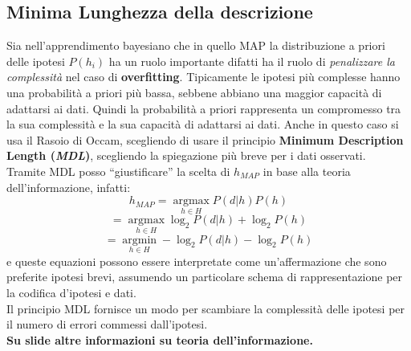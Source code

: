 \subsection{Minima Lunghezza della descrizione}
Sia nell'apprendimento bayesiano che in quello MAP la distribuzione a priori delle ipotesi $P(h_i)$ ha un ruolo importante difatti ha il ruolo di \textit{penalizzare la complessità} nel caso di \textbf{overfitting}. Tipicamente le ipotesi più complesse hanno una probabilità a priori più bassa, sebbene abbiano una maggior capacità di adattarsi ai dati. Quindi la probabilità a priori rappresenta un compromesso tra la sua complessità e la sua capacità di adattarsi ai dati.
Anche in questo caso si usa il Rasoio di Occam, scegliendo di usare il principio
\textbf{Minimum Description Length (\textit{MDL})}, scegliendo la spiegazione
più breve per i dati osservati.\\
Tramite MDL posso ``giustificare'' la scelta di $h_{MAP}$ in base alla teoria
dell'informazione, infatti:
\[h_{MAP}=\operatorname*{argmax}_{h\in H}P(d|h)P(h)\]
\[=\operatorname*{argmax}_{h\in H}\log_2P(d|h)+\log_2P(h)\]
\[=\operatorname*{argmin}_{h\in H}-\log_2P(d|h)-\log_2P(h)\]
e queste equazioni possono essere interpretate come un'affermazione che sono
preferite ipotesi brevi, assumendo un particolare schema di rappresentazione per
la codifica d'ipotesi e dati.\\
Il principio MDL fornisce un modo per scambiare la complessità delle ipotesi
per il numero di errori commessi dall'ipotesi.\\

\textbf{Su slide altre informazioni su teoria dell'informazione.}
